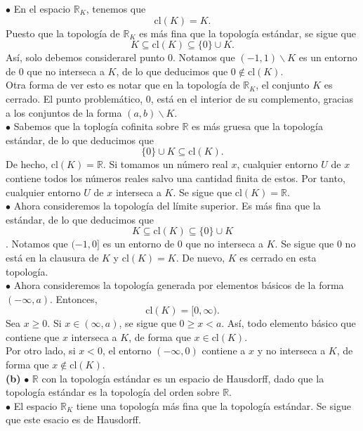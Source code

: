 \documentclass{article}
\begin{document}
$\bullet$ En el espacio $\mathbb{R}_{K}$, tenemos que 
$$ \text{cl}(K) =K. $$
Puesto que la topología de $\mathbb{R}_{K}$ es más fina que la topología estándar, se sigue que
$$K \subseteq \text{cl}(K) \subseteq \{ 0 \} \cup K. $$
Así, solo debemos considerarel punto $0$. Notamos que $(-1, 1) \backslash K$ es un entorno de $0$ que no interseca a $K$, de lo que deducimos que $0 \notin \text{cl}(K)$. \\

Otra forma de ver esto es notar que en la topología de $\mathbb{R}_{K}$, el conjunto $K$ es cerrado. El punto problemático, $0$, está en el interior de su complemento, gracias a los conjuntos de la forma $(a, b) \backslash K$.  \\

$\bullet$ Sabemos que la toplogía cofinita sobre $\mathbb{R}$  es más gruesa que la topología estándar, de lo que deducimos que
$$ \{0\} \cup K \subseteq \text{cl}(K). $$ 
De hecho, $\text{cl}(K) = \mathbb{R}$. Si tomamos un número real $x$, cualquier entorno $U$ de $x$ contiene todos los números reales salvo una cantidad finita de estos. Por tanto, cualquier entorno $U$ de $x$ interseca a $K$. Se sigue que $\text{cl}(K) = \mathbb{R}$. \\

$\bullet$ Ahora consideremos la topología del límite superior. Es más fina que la estándar, de lo que deducimos que 
$$ K \subseteq  \text{cl}(K) \subseteq \{0\} \cup K $$.
Notamos que $(-1, 0]$ es un entorno de $0$ que no interseca a $K$. Se sigue que $0$ no está en la clausura de $K$ y $\text{cl}(K) = K$. De nuevo, $K$ es cerrado en esta topología. \\

$\bullet$ Ahora consideremos la topología generada por elementos básicos de la forma $(-\infty, a)$. Entonces, 
$$ \text{cl}(K) = [0, \infty) .$$
Sea $x \geq 0$. Si $x \in (\infty, a)$, se sigue que $0 \geq x < a$. Así, todo elemento básico que contiene que $x$ interseca a $K$, de forma que $x \in \text{cl}(K)$. \\
Por otro lado, si $x < 0$, el entorno $(-\infty, 0)$ contiene a $x$ y no interseca a $K$, de forma que $x \notin \text{cl}(K)$. \\

\textbf{(b)} $\bullet$ $\mathbb{R}$ con la topología estándar es un espacio de Hausdorff, dado que la topología estándar es la topología del orden sobre $\mathbb{R}$. \\

$\bullet$ El espacio $\mathbb{R}_{K}$ tiene una topología más fina que la topología estándar. Se sigue que este esacio es de Hausdorff. \\
\end{document}
